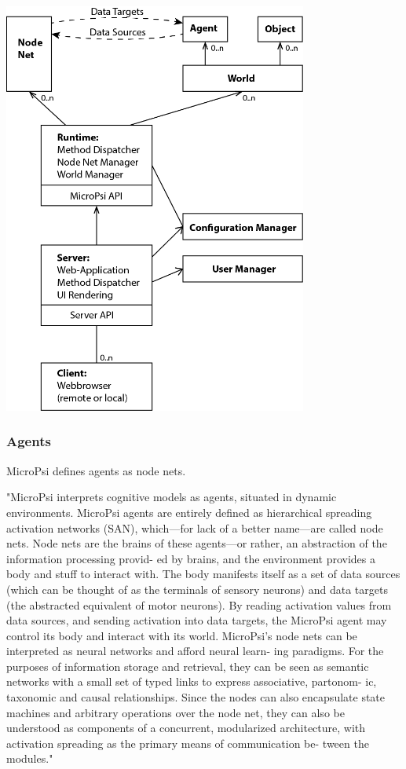             \includegraphics[width=10cm]{graphics/micropsi2_uml}
            
            \subsubsection{Agents}
MicroPsi defines agents as node nets.~\cite{conf/agi/Bach12}
                
"MicroPsi interprets cognitive models as agents, situated in dynamic environments. MicroPsi agents are entirely defined as hierarchical spreading activation networks (SAN), which—for lack of a better name—are called node nets. Node nets are the brains of these agents—or rather, an abstraction of the information processing provid- ed by brains, and the environment provides a body and stuff to interact with.
The body manifests itself as a set of data sources (which can be thought of as the terminals of sensory neurons) and data targets (the abstracted equivalent of motor neurons). By reading activation values from data sources, and sending activation into data targets, the MicroPsi agent may control its body and interact with its world.
MicroPsi’s node nets can be interpreted as neural networks and afford neural learn- ing paradigms. For the purposes of information storage and retrieval, they can be seen as semantic networks with a small set of typed links to express associative, partonom- ic, taxonomic and causal relationships.
Since the nodes can also encapsulate state machines and arbitrary operations over the node net, they can also be understood as components of a concurrent, modularized architecture, with activation spreading as the primary means of communication be- tween the modules."~\cite{conf/agi/Bach12}

